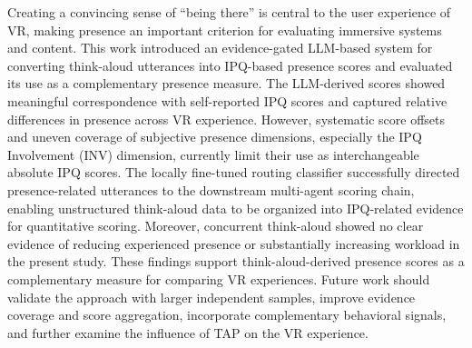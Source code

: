 Creating a convincing sense of ``being there'' is central to the user experience of VR, making presence an important criterion for evaluating immersive systems and content. 
This work introduced an evidence-gated LLM-based system for converting think-aloud utterances into IPQ-based presence scores and evaluated its use as a complementary presence measure.
The LLM-derived scores showed meaningful correspondence with self-reported IPQ scores and captured relative differences in presence across VR experience.
However, systematic score offsets and uneven coverage of subjective presence dimensions, especially the IPQ Involvement (INV) dimension, currently limit their use as interchangeable absolute IPQ scores.
The locally fine-tuned routing classifier successfully directed presence-related utterances to the downstream multi-agent scoring chain, enabling unstructured think-aloud data to be organized into IPQ-related evidence for quantitative scoring. Moreover, concurrent think-aloud showed no clear evidence of reducing experienced presence or substantially increasing workload in the present study. 
These findings support think-aloud-derived presence scores as a complementary measure for comparing VR experiences.
Future work should validate the approach with larger independent samples, improve evidence coverage and score aggregation, incorporate complementary behavioral signals, and further examine the influence of TAP on the VR experience.




